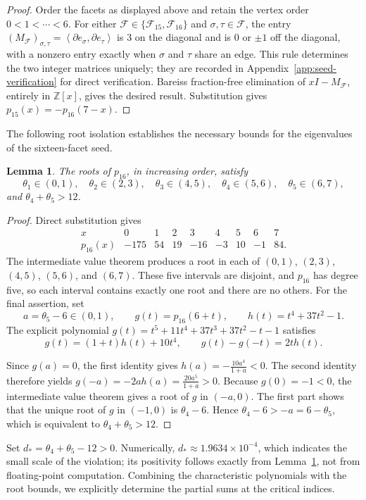 \documentclass[11pt]{article}
\newtheorem{lemma}[theorem]{Lemma}
\newcommand{\bd}{\partial}
\newcommand{\ip}[2]{\left\langle #1,#2\right\rangle}
\newcommand{\calF}{\mathcal{F}}
\begin{document}
	\begin{proof}
		Order the facets as displayed above and retain the vertex order
		\(0<1<\cdots<6\).  For either
		\(\calF\in\{\calF_{15},\calF_{16}\}\) and
		\(\sigma,\tau\in\calF\), the entry
		\((M_{\calF})_{\sigma,\tau}=\ip{\bd e_\sigma}{\bd e_\tau}\) is \(3\) on the
		diagonal and is \(0\) or \(\pm1\) off the diagonal, with a nonzero entry
		exactly when \(\sigma\) and \(\tau\) share an edge.  This rule determines
		the two integer matrices uniquely; they are recorded in
		Appendix~\ref{app:seed-verification} for direct verification.
		Bareiss fraction-free elimination of \(xI-M_{\calF}\), entirely in
		\(\mathbb Z[x]\), gives
		the desired result.  Substitution gives
		\(p_{15}(x)=-p_{16}(7-x)\).
	\end{proof}
	The following root isolation establishes the necessary bounds for the eigenvalues of the sixteen-facet seed.
	\begin{lemma}\label{lem:seed-roots}
		The roots of \(p_{16}\), in increasing order, satisfy
		\[
		\theta_1\in(0,1),\quad
		\theta_2\in(2,3),\quad
		\theta_3\in(4,5),\quad
		\theta_4\in(5,6),\quad
		\theta_5\in(6,7),
		\]
		and \(\theta_4+\theta_5>12\).
	\end{lemma}
	
	\begin{proof}
		Direct substitution gives
		\[
		\begin{array}{c|rrrrrrrr}
			x&0&1&2&3&4&5&6&7\\ \hline
			p_{16}(x)&-175&54&19&-16&-3&10&-1&84.
		\end{array}
		\]
		The intermediate value theorem produces a root in each of
		\((0,1)\), \((2,3)\), \((4,5)\), \((5,6)\), and \((6,7)\).
		These five intervals are disjoint, and \(p_{16}\) has degree five, so
		each interval contains exactly one root and there are no others.
		For the final assertion, set
		\[
		a=\theta_5-6\in(0,1),
		\qquad
		g(t)=p_{16}(6+t),
		\qquad
		h(t)=t^4+37t^2-1.
		\]
		The explicit polynomial $g(t)=t^5+11t^4+37t^3+37t^2-t-1$
		satisfies
		\[
		g(t)=(1+t)h(t)+10t^4,
		\qquad
		g(t)-g(-t)=2t h(t).
		\]
		
		Since \(g(a)=0\), the first identity gives
		$h(a)=-\frac{10a^4}{1+a}<0.$
		The second identity therefore yields
		$g(-a)=-2a h(a)=\frac{20a^5}{1+a}>0.$
		Because \(g(0)=-1<0\), the intermediate value theorem gives a root of
		\(g\) in \((-a,0)\).  The first part shows that the unique root of
		\(g\) in \((-1,0)\) is \(\theta_4-6\).  Hence
		$\theta_4-6>-a=6-\theta_5,$
		which is equivalent to \(\theta_4+\theta_5>12\).
	\end{proof}
	Set
$
d_*=\theta_4+\theta_5-12>0.
$
	Numerically, \(d_*\approx1.9634\times10^{-4}\), which indicates the
	small scale of the violation; its positivity follows exactly from
	Lemma~\ref{lem:seed-roots}, not from floating-point computation.
Combining the characteristic polynomials with the root bounds,
we explicitly determine the partial sums at the critical indices.
	
\end{document}
